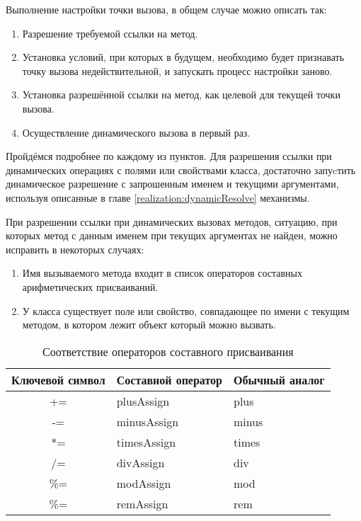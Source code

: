 Выполнение настройки точки вызова, в общем случае можно описать так:

\begin{enumerate}
\item Разрешение требуемой ссылки на метод.
\item Установка условий, при которых в будущем, необходимо будет признавать точку вызова недействительной, и запускать процесс настройки заново.
\item Установка разрешённой ссылки на метод, как целевой для текущей точки вызова.
\item Осуществление динамического вызова в первый раз.
\end{enumerate}

Пройдёмся подробнее по каждому из пунктов. Для разрешения ссылки при динамических операциях с полями или свойствами класса, достаточно запуcтить динамическое разрешение с запрошенным именем и текущими аргументами, используя описанные в главе \ref{realization:dynamicResolve} механизмы.

При разрешении ссылки при динамических вызовах методов, ситуацию, при которых метод с данным именем при текущих аргументах не найден, можно исправить в некоторых случаях:

\begin{enumerate}
    \item Имя вызываемого метода входит в список операторов составных арифметических присваиваний.
    \item У класса существует поле или свойство, совпадающее по имени с текущим методом, в котором лежит объект который можно вызвать.
\end{enumerate}


\begin{table}[h]
\caption{\label{tab:compoundAssignment}Соответствие операторов составного присваивания}
\begin{center}
\begin{tabular}{|c|l|l|}
\hline
Ключевой символ & Составной оператор	& Обычный аналог \\
\hline
+=  & plusAssign             & plus   \\
-=  & minusAssign            & minus  \\
*=  & timesAssign            & times  \\
/=  & divAssign              & div    \\
\%= & modAssign              & mod    \\
\%= & remAssign\footnotemark & rem\footnotemark[\value{footnote}]   \\
\hline
\end{tabular}
\end{center}
\end{table} 

